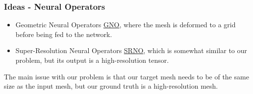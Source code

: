 \documentclass{beamer}
\begin{document}
\begin{frame}
    \frametitle{Ideas - Neural Operators}
    \begin{itemize}
        \item Geometric Neural Operators \href{https://arxiv.org/pdf/2207.05209}{GNO}, where the mesh is deformed to a grid before being fed to the network.
        \item Super-Resolution Neural Operators \href{https://arxiv.org/pdf/2303.02584}{SRNO}, which is somewhat similar to our problem, but its output is a high-resolution tensor.
    \end{itemize}

    The main issue with our problem is that our target mesh needs to be of the same size as the input mesh, but our ground truth is a high-resolution mesh.
    

\end{frame}
\end{document}
